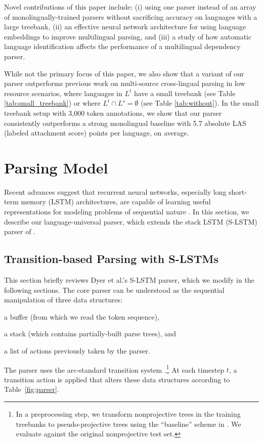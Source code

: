 \documentclass[11pt]{article}
\newenvironment{itemizesquish}{\begin{list}{\labelitemi}{\setlength{\itemsep}{0em}\setlength{\labelwidth}{0.5em}\setlength{\leftmargin}{\labelwidth}\addtolength{\leftmargin}{\labelsep}}}{\end{list}}
\begin{document}
Novel contributions of this paper include: (i) using one parser instead of an array of monolingually-trained parsers without sacrificing accuracy on languages with a large treebank, (ii) an effective neural network architecture for using language embeddings to improve multilingual parsing, and (iii) a study of how automatic language identification affects the performance of a multilingual dependency parser.

While not the primary focus of this paper, we also show that a variant of our parser outperforms previous work on multi-source cross-lingual parsing in low resource scenarios, where languages in $L^t$ have a small treebank (see Table \ref{tab:small_treebank}) or where $L^t \cap L^s = \emptyset$ (see Table \ref{tab:without}).
In the small treebank setup with 3,000 token annotations, we show that our parser consistently outperforms a strong monolingual baseline with 5.7 absolute LAS (labeled attachment score) points per language, on average.

\section{Parsing Model}
\label{sec:model}

Recent advances suggest that recurrent neural networks, especially long short-term memory (LSTM) architectures, are capable of learning useful representations for modeling problems of sequential nature  \cite{graves:13,sutskever:14}.
In this section, we describe our language-universal parser, which extends the stack LSTM (S-LSTM) parser of .

\subsection{Transition-based Parsing with S-LSTMs}
\label{sec:slstm}

This section briefly reviews Dyer et al.'s S-LSTM parser, which we modify in the following sections.
The core parser can be understood as the sequential manipulation of three data structures:
\begin{itemizesquish}
\item a buffer (from which we read the token sequence),  
\item a stack (which contains partially-built parse trees), and 
\item a list of actions previously taken by the parser. 
\end{itemizesquish}
The parser uses the arc-standard transition system \cite{nivre:04}.\footnote{In a preprocessing step, we transform nonprojective trees in the training treebanks to pseudo-projective trees using the ``baseline'' scheme in \cite{nivre:05}. We evaluate against the original nonprojective test set.} 
At each timestep $t$, a transition action is applied that alters these data structures according to Table~\ref{fig:parser}.
\end{document}
